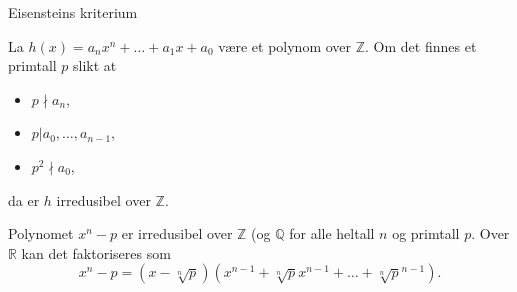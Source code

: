 \documentclass[norsk]{beamer}
\theoremstyle{example}
\begin{document}
\begin{frame}{Eisensteins kriterium}
    \begin{theorem}
        La $h(x) = a_n x^n + \dots + a_1 x + a_0$ være et polynom over $\mathbb Z$.
        Om det finnes et primtall $p$
        slikt at
        \begin{itemize}
            \item $p\nmid a_n$,
            \item $p | a_0,\dots, a_{n -  1}$,
            \item $p^2 \nmid a_0$,
        \end{itemize}
        da er $h$ irredusibel over $\mathbb Z$.
    \end{theorem}
    \begin{example}
        Polynomet $x^n - p$ er irredusibel over $\mathbb Z$ (og $\mathbb Q$ for alle heltall $n$ og primtall $p$.
        Over $\mathbb R$ kan det faktoriseres som
        \[
            x^n - p = (x - \sqrt[n] p) (x^{n - 1} + \sqrt[n] p x^{n - 1} + \dots + \sqrt [n] p^{n - 1}).
        \]
    \end{example}
\end{frame}
\end{document}
